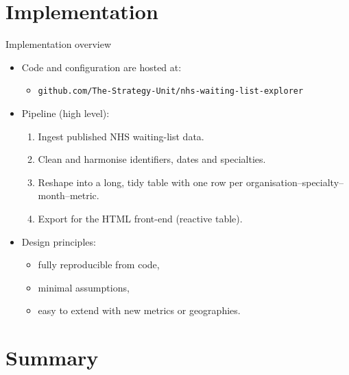 \documentclass{beamer}
\begin{document}
\section{Implementation}

\begin{frame}{Implementation overview}
  \begin{itemize}
    \item Code and configuration are hosted at:
      \begin{itemize}
        \item \texttt{github.com/The-Strategy-Unit/nhs-waiting-list-explorer}
      \end{itemize}
    \item Pipeline (high level):
      \begin{enumerate}
        \item Ingest published NHS waiting-list data.
        \item Clean and harmonise identifiers, dates and specialties.
        \item Reshape into a long, tidy table with one row per
          organisation--specialty--month--metric.
        \item Export for the HTML front-end (reactive table).
      \end{enumerate}
    \item Design principles:
      \begin{itemize}
        \item fully reproducible from code,
        \item minimal assumptions,
        \item easy to extend with new metrics or geographies.
      \end{itemize}
  \end{itemize} 
\end{frame}

\section{Summary}
\end{document}
